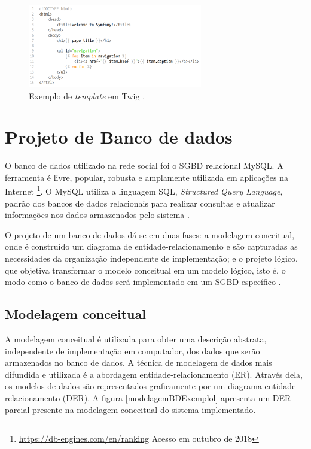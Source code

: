 \documentclass[cic,tc]{iiufrgs}
\begin{document}
\bigskip

\begin{figure}[ht]
    \caption{Exemplo de \textit{template} em Twig .}
        \begin{center}
            \includegraphics[width=0.68\textwidth]{figuras/twig-symf.png}
        \end{center}
    \label{codeTemplateTwig}
\end{figure}


\section{Projeto de Banco de dados}
\label{metodologiaBD}

O banco de dados utilizado na rede social foi o SGBD relacional MySQL. A ferramenta é livre, popular, robusta e amplamente utilizada em aplicações na Internet \footnote{\url{https://db-engines.com/en/ranking} Acesso em outubro de 2018}. O MySQL utiliza a linguagem SQL, \textit{Structured Query Language}, padrão dos bancos de dados relacionais para realizar consultas e atualizar informações nos dados armazenados pelo sistema \cite{sqlCompleteBook}.

O projeto de um banco de dados dá-se em duas fases: a modelagem conceitual, onde é construído um diagrama de entidade-relacionamento \cite{peterChen1976} e são capturadas as necessidades da organização independente de implementação; e o projeto lógico, que objetiva transformar o modelo conceitual em um modelo lógico, isto é, o modo como o banco de dados será implementado em um SGBD específico \cite{heuser}.

\subsection{Modelagem conceitual}
\label{BDModelagem}

A modelagem conceitual é utilizada para obter uma descrição abstrata, independente de implementação em computador, dos dados que serão armazenados no banco de dados. A técnica de modelagem de dados mais difundida e utilizada é a abordagem entidade-relacionamento (ER). \cite{heuser} Através dela, os modelos de dados são representados graficamente por um diagrama entidade-relacionamento (DER). A figura \ref{modelagemBDExemplol} apresenta um DER parcial presente na modelagem conceitual do sistema implementado.
\end{document}

